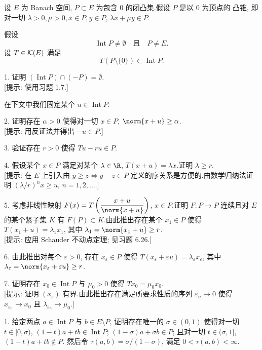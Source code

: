 \begin{problem}[第 1, 6 章]
\label{prob:41}
设 $E$ 为 Banach 空间, $P\subset E$ 为包含 $0$ 的闭凸集.假设 $P$ 是以 $0$ 为顶点的
凸锥, 即对一切 $\lambda>0,\mu>0,x\in P,y\in P$, $\lambda x+\mu y\in P$.

假设
\begin{equation}
\operatorname{Int}P\ne\emptyset\quad\text{且}\quad P\ne E.
\label{eq:prob41.1}
\end{equation}
设 $T\in\mathcal{K}(E)$ 满足
\begin{equation}
T(P\setminus\{0\})\subset\operatorname{Int}P.
\label{eq:prob41.2}
\end{equation}


1. 证明 $(\operatorname{Int}P)\cap(-P)=\emptyset$.\\
{[提示: 使用习题 1.7.]}

在下文中我们固定某个 $u\in\operatorname{Int}P$.

2. 证明存在 $\alpha>0$ 使得对一切 $x\in P$, $\norm{x+u}\ge\alpha$.\\
{[提示: 用反证法并得出 $-u\in P$.]}

3. 验证存在 $r>0$ 使得 $Tu-ru\in P$.

4. 假设某个 $x\in P$ 满足对某个 $\lambda\in\R$, $T(x+u)=\lambda x$.证明 $\lambda\ge r$.\\
{[提示: 在 $E$ 上引入由 $y\ge z\iff y-z\in P$ 定义的序关系是方便的.由数学归纳法证明
$(\lambda/r)^nx\ge u$, $n=1,2,\dots$.]}

5. 考虑非线性映射 $F(x)=T\left(\dfrac{x+u}{\norm{x+u}}\right)$, $x\in P$.证明
$F:P\to P$ 连续且对 $E$ 的某个紧子集 $K$ 有 $F(P)\subset K$.由此推出存在某个
$x_1\in P$ 使得 $T(x_1+u)=\lambda_1x_1$, 其中 $\lambda_1=\norm{x_1+u}\ge r$.\\
{[提示: 应用 Schauder 不动点定理; 见习题 6.26.]}

6. 由此推出对每个 $\varepsilon>0$, 存在 $x_\varepsilon\in P$ 使得
$T(x_\varepsilon+\varepsilon u)=\lambda_\varepsilon x_\varepsilon$, 其中
$\lambda_\varepsilon=\norm{x_\varepsilon+\varepsilon u}\ge r$.

7. 证明存在 $x_0\in\operatorname{Int}P$ 与 $\mu_0>0$ 使得 $Tx_0=\mu_0x_0$.\\
{[提示: 证明 $(x_\varepsilon)$ 有界.由此推出存在满足所要求性质的序列
$\varepsilon_n\to0$ 使得 $x_{\varepsilon_n}\to x_0$ 且 $\lambda_{\varepsilon_n}\to\mu_0$.]}


1. 给定两点 $a\in\operatorname{Int}P$ 与 $b\in E\setminus P$, 证明存在唯一的
$\sigma\in(0,1)$ 使得对一切 $t\in[0,\sigma)$, $(1-t)a+tb\in\operatorname{Int}P$;
$(1-\sigma)a+\sigma b\in P$; 且对一切 $t\in(\sigma,1]$, $(1-t)a+tb\notin P$.
然后令 $\tau(a,b)=\sigma/(1-\sigma)$, 满足 $0<\tau(a,b)<\infty$.


\end{problem}
